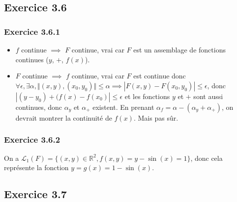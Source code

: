 \documentclass[]{book}
\theoremstyle{definition}
\newcommand{\bb}[1]{\mathbb{#1}}
\newcommand{\R}{\bb{R}}
\begin{document}
\begin{center}
\end{center}

\subsection*{Exercice 3.6}
\subsubsection*{Exercice 3.6.1}
\begin{itemize}
\item $f$ continue $\implies$ $F$ continue, vrai car $F$ est un assemblage de fonctions continues ($y$, $+$, $f(x)$).
\item $F$ continue $\implies$ $f$ continue, vrai car $F$ est continue donc $\forall \epsilon, \exists \alpha, \Vert(x,y),(x_0,y_0)\Vert \leq \alpha \implies |F(x,y)-F(x_0,y_0)| \leq \epsilon$, donc $|(y-y_0)+(f(x)-f(x_0)| \leq \epsilon$ et les fonctions $y$ et $+$ sont aussi continues, donc $\alpha_y$ et $\alpha_{+}$ existent. En prenant $\alpha_{f} = \alpha - (\alpha_y + \alpha_{+})$, on devrait montrer la continuit\'e de $f(x)$. Mais pas s\^ur. 
\end{itemize}

\subsubsection*{Exercice 3.6.2}
On a $\mathscr{L}_{1}(F) = \{(x,y) \in \R^2, f(x,y) = y-\sin(x) = 1\}$, donc cela repr\'esente la fonction $y=g(x)=1-\sin(x)$.\\


\subsection*{Exercice 3.7}
\end{document}
